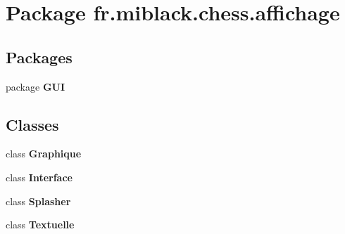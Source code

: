 \section{Package fr.\-miblack.\-chess.\-affichage}
\label{namespacefr_1_1miblack_1_1chess_1_1affichage}
\subsection*{Packages}
\begin{DoxyCompactItemize}
\item 
package {\bf G\-U\-I}
\end{DoxyCompactItemize}
\subsection*{Classes}
\begin{DoxyCompactItemize}
\item 
class {\bf Graphique}
\item 
class {\bf Interface}
\item 
class {\bf Splasher}
\item 
class {\bf Textuelle}
\end{DoxyCompactItemize}

